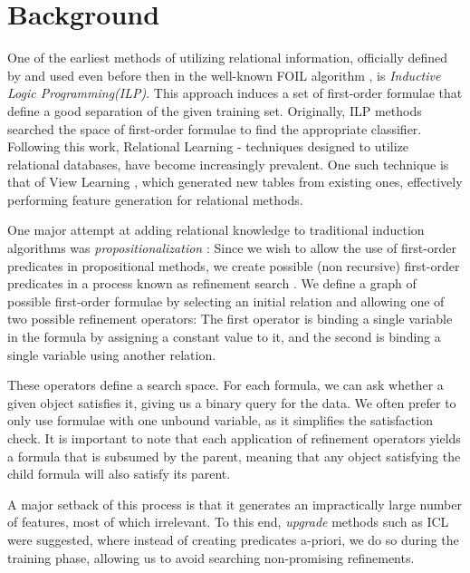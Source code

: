 \documentclass{article}
\theoremstyle{definition}
\begin{document}
\section{Background} \label{background}

One of the earliest methods of utilizing relational information, officially defined by \citet{muggleton1991inductive} and used even before then in the well-known FOIL algorithm \citep{quinlan1990learning}, is \emph{Inductive Logic Programming(ILP)}. This approach induces a set of first-order formulae
that define a good separation of the given training set. Originally, ILP methods searched the space of first-order formulae to find the appropriate classifier.
Following this work, Relational Learning - techniques designed to utilize relational databases, have become increasingly prevalent. One such technique is that of View Learning \citep{davis2005view}, which generated new tables from existing ones, effectively performing feature generation for relational methods.

One major attempt at adding relational knowledge to traditional induction algorithms was \emph{propositionalization} \citep{kramer2000bottom}: Since we wish to allow the use of first-order predicates in propositional methods, we create possible (non recursive) first-order predicates in a process known as refinement search \citep{van1998completeness}.
We define a graph of possible first-order formulae by selecting an initial relation and allowing one of two possible refinement operators: The first operator is binding a single variable in the formula by assigning a constant value to it, and the second is binding a single variable using another relation.

These operators define a search space. For each formula, we can ask whether a given object satisfies it, giving us a binary query for the data. We often prefer to only use formulae with one unbound variable, as it simplifies the satisfaction check.
It is important to note that each application of refinement operators yields a formula that is subsumed by the parent, meaning that any object satisfying the child formula will also satisfy its parent.

A major setback of this process is that it generates an impractically large number of features, most of which irrelevant.  To this end, \emph{upgrade} methods such as ICL \citep{van2001upgrade} were suggested, where instead of creating predicates a-priori, we do so during the training phase, allowing us to avoid searching non-promising refinements.
\end{document}
